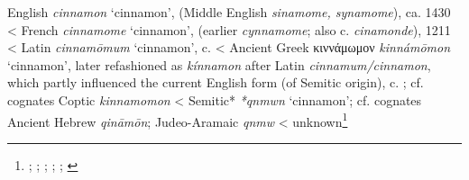 \begin{etymology}\label{ety:cinnamon}
English \textit{cinnamon} `cinnamon', (Middle English \textit{sinamome, synamome}), ca. 1430
< French \textit{cinnamome} `cinnamon', (earlier \textit{cynnamome}; also  c. \textit{cinamonde}), 1211
< Latin \textit{cinnamōmum} `cinnamon',  c. \AD{}
< Ancient Greek {κιννάμωμον} \textit{kinnámōmon} `cinnamon', later refashioned as \textit{kínnamon} after Latin \textit{cinnamum/cinnamon}, which partly influenced the current English form (of Semitic origin),  c. \BC{}; cf. cognates Coptic  \textit{kinnamomon}
< Semitic* \textit{*qnmwn} `cinnamon'; cf. cognates Ancient Hebrew  \textit{qināmōn}; Judeo-Aramaic  \textit{qnmw}
< unknown\footnote{\textcite[s.v. cinnamon]{oed}; \textcite{tlfi}; \textcite{lewis_latin_1879}; \textcite[701]{beekes_etymological_2010}; \textcite[585]{klein_comprehensive_1987}; \textcite{rosol_early_2018}}
\end{etymology}